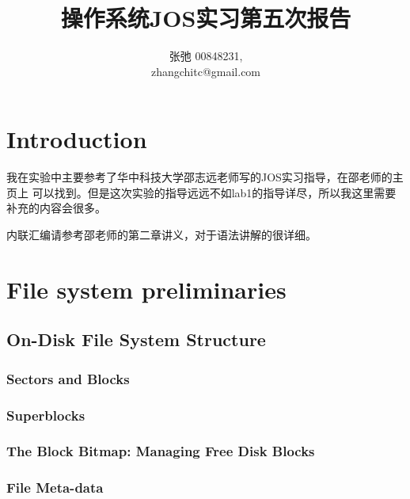 \documentclass{article}
\begin{document}
\begin{CJK*}{UTF8}{gkai}

\title{操作系统JOS实习第五次报告}
\author{张弛 \hspace{1ex} 00848231, \\
        zhangchitc@gmail.com}

\maketitle
\tableofcontents
\newpage

\section{Introduction}

我在实验中主要参考了华中科技大学邵志远老师写的JOS实习指导，在邵老师的主页上 可以找到。但是这次实验的指导远远不如lab1的指导详尽，所以我这里需要补充的内容会很多。

内联汇编请参考邵老师的第二章讲义，对于语法讲解的很详细。

\section{File system preliminaries}

\subsection{On-Disk File System Structure}

\subsubsection{Sectors and Blocks}

\subsubsection{Superblocks}

\subsubsection{The Block Bitmap: Managing Free Disk Blocks}

\label{bitmap}

\subsubsection{File Meta-data}


\end{CJK*}
\end{document}
